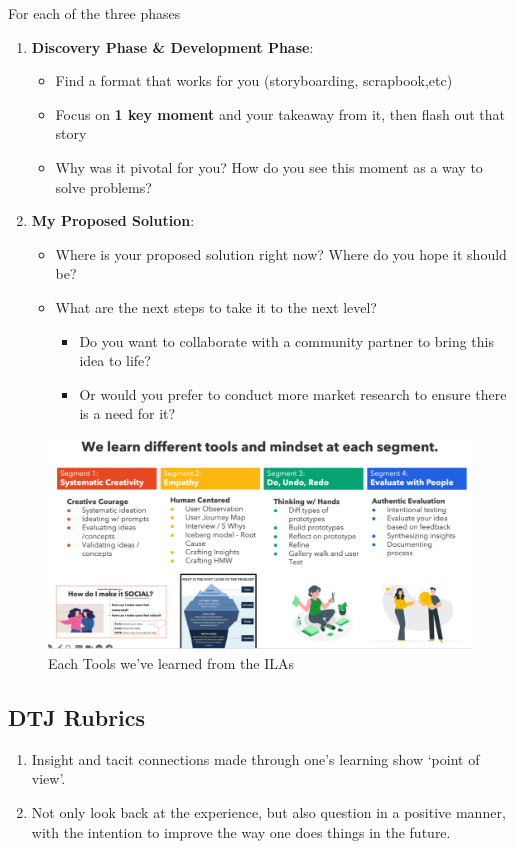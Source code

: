 \documentclass[math,code]{amznotes}
\theoremstyle{remark}
\begin{document}
For each of the three phases
\begin{enumerate}
    \item \textbf{Discovery Phase \& Development Phase}:
    \begin{itemize}
        \item Find a format that works for you (storyboarding, scrapbook,etc)
        \item Focus on \textbf{1 key moment} and your takeaway from it, then flash out that story
        \item Why was it pivotal for you? How do you see this moment as a way to solve problems?
    \end{itemize}
    \item \textbf{My Proposed Solution}:
    \begin{itemize}
        \item Where is your proposed solution right now? Where do you hope it should be?
        \item What are the next steps to take it to the next level?
        \begin{itemize}
            \item Do you want to collaborate with a community partner to bring this idea to life?
            \item Or would you prefer to conduct more market research to ensure there is a need for it?
        \end{itemize}
    \end{itemize}
\end{enumerate}
\begin{figure}
    \centering
    \includegraphics[width=0.75\linewidth]{images/dtj-reference.png}
    \caption{Each Tools we've learned from the ILAs}
    \label{fig:dtj-reference}
\end{figure}

\subsection{DTJ Rubrics}
\begin{enumerate}
    \item Insight and tacit connections made through one's learning show `point of view'.
    \item Not only look back at the experience, but also question in a positive manner, with the intention to improve the way one does things in the future.
\end{enumerate}
\end{document}
